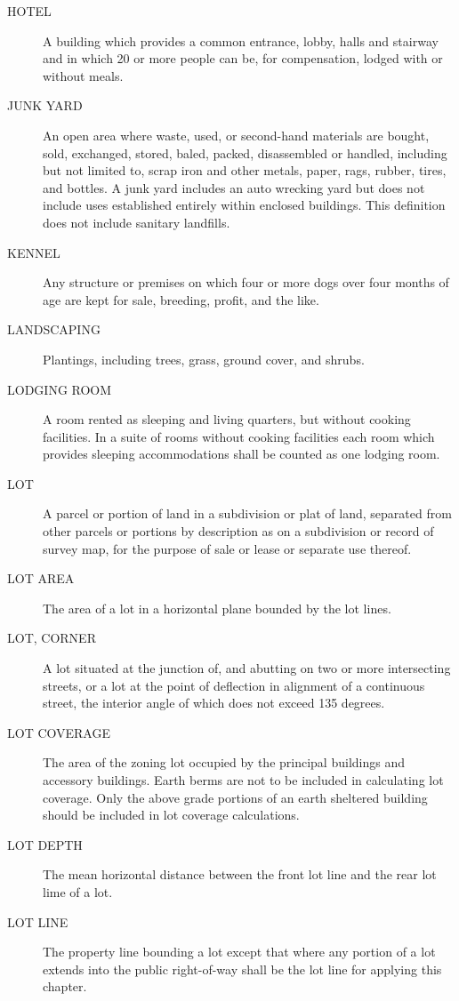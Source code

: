 \begin{description}
    \item[HOTEL] A building which provides a common entrance, lobby, halls and stairway and in which 20 or more people can be, for compensation, lodged with or without meals.
    \item[JUNK YARD] An open area where waste, used, or second-hand materials are bought, sold, exchanged, stored, baled, packed, disassembled or handled, including but not limited to, scrap iron and other metals, paper, rags, rubber, tires, and bottles.  A junk yard includes an auto wrecking yard but does not include uses established entirely within enclosed buildings.  This definition does not include sanitary landfills.
    \item[KENNEL] Any structure or premises on which four or more dogs over four months of age are kept for sale, breeding, profit, and the like.
    \item[LANDSCAPING] Plantings, including trees, grass, ground cover, and shrubs.
    \item[LODGING ROOM] A room rented as sleeping and living quarters, but without cooking facilities. In a suite of rooms without cooking facilities each room which provides sleeping accommodations shall be counted as one lodging room.
    \item[LOT] A parcel or portion of land in a subdivision or plat of land, separated from other parcels or portions by description as on a subdivision or record of survey map, for the purpose of sale or lease or separate use thereof.
    \item[LOT AREA] The area of a lot in a horizontal plane bounded by the lot lines.
    \item[LOT, CORNER] A lot situated at the junction of, and abutting on two or more intersecting streets, or a lot at the point of deflection in alignment of a continuous street, the interior angle of which does not exceed 135 degrees.
    \item[LOT COVERAGE]The area of the zoning lot occupied by the principal buildings and accessory buildings. Earth berms are not to be included in calculating lot coverage.  Only the above grade portions of an earth sheltered building should be included in lot coverage calculations.
    \item[LOT DEPTH] The mean horizontal distance between the front lot line and the rear lot lime of a lot.
    \item[LOT LINE] The property line bounding a lot except that where any portion of a lot extends into the public right-of-way shall be the lot line for applying this chapter.

\end{description}
